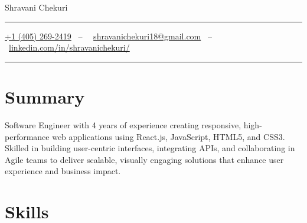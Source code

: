 \documentclass[letterpaper,10pt]{article}
\newcommand{\documentTitle}[2]{
  \begin{center}
    {\Huge\color{accentTitle} #1}
    \vspace{10pt}
    {\color{accentLine} \hrule}
    \vspace{2pt}
    \footnotesize{#2}
    \vspace{2pt}
    {\color{accentLine} \hrule}
  \end{center}
}
\begin{document}

  \documentTitle{Shravani Chekuri}{
    \vspace{-0.8em} %
\begin{center}
\begin{minipage}{0.8\textwidth}
\centering
\href{tel:+14052691066}{\raisebox{-0.05\height}{\faPhone} +1 (405) 269-2419} \, -- \,
\faEnvelope\ \href{mailto:shravanichekuri18@gmail.com}{shravanichekuri18@gmail.com} \, -- \,
\faLinkedinSquare\ \href{https://www.linkedin.com/in/shravanichekuri/}{linkedin.com/in/shravanichekuri/}
\end{minipage}
\end{center}
\vspace{-0.5em} %



  }




  \section{Summary}{}
      \item Software Engineer with 4 years of experience creating responsive, high-performance web applications using React.js, JavaScript, HTML5, and CSS3. Skilled in building user-centric interfaces, integrating APIs, and collaborating in Agile teams to deliver scalable, visually engaging solutions that enhance user experience and business impact.

  \section{Skills}
\end{document}
